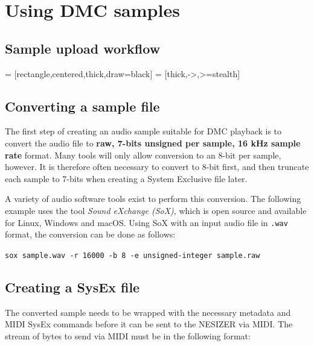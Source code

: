 \documentclass[a4paper, 12p]{extarticle}
\begin{document}
\section{Using DMC samples}

\subsection{Sample upload workflow}

 = [rectangle,centered,thick,draw=black]
 = [thick,->,>=stealth]

\subsection{Converting a sample file}
The first step of creating an audio sample suitable for DMC playback is to convert the audio file to \textbf{raw, 7-bits unsigned per sample, 16 kHz sample rate} format. Many tools will only allow conversion to an 8-bit per sample, however. It is therefore often necessary to convert to 8-bit first, and then truncate each sample to 7-bits when creating a System Exclusive file later.

A variety of audio software tools exist to perform this conversion. The following example uses the tool \emph{Sound eXchange (SoX)}, which is open source and available for Linux, Windows and macOS. Using SoX with an input audio file in \verb+.wav+ format, the conversion can be done as follows:

\verb+sox sample.wav -r 16000 -b 8 -e unsigned-integer sample.raw+

\subsection{Creating a SysEx file}
The converted sample needs to be wrapped with the necessary metadata and MIDI SysEx commands before it can be sent to the NESIZER via MIDI. The stream of bytes to send via MIDI must be in the following format:
\end{document}
